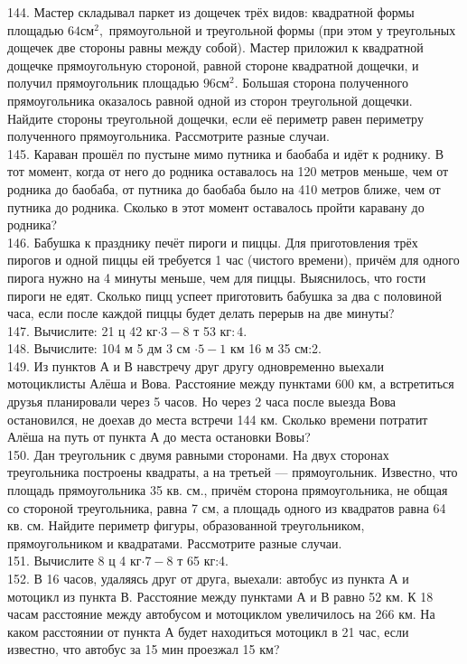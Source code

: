144. Мастер складывал паркет из дощечек трёх видов: квадратной формы площадью $64\text{см}^2,$ прямоугольной и треугольной формы (при этом у треугольных дощечек две стороны равны между собой). Мастер приложил к квадратной дощечке прямоугольную стороной, равной стороне квадратной дощечки, и получил прямоугольник площадью $96\text{см}^2.$ Большая сторона полученного прямоугольника оказалось равной одной из сторон треугольной дощечки. Найдите стороны треугольной дощечки, если её периметр равен периметру полученного прямоугольника. Рассмотрите разные случаи.\\
145. Караван прошёл по пустыне мимо путника и баобаба и идёт к роднику. В тот момент, когда от него до родника оставалось на 120 метров меньше, чем от родника до баобаба, от путника до баобаба было на 410 метров ближе, чем от путника до родника. Сколько в этот момент оставалось пройти каравану до родника?\\
146. Бабушка к празднику печёт пироги и пиццы. Для приготовления трёх пирогов и одной пиццы ей требуется 1 час (чистого времени), причём для одного пирога нужно на 4 минуты меньше, чем для пиццы. Выяснилось, что гости пироги не едят. Сколько пицц успеет приготовить бабушка за два с половиной часа, если после каждой пиццы будет делать перерыв на две минуты?\\
147. Вычислите: 21 ц 42 кг$\cdot3-8$ т 53 кг$:4.$\\
148. Вычислите: 104 м 5 дм 3 см $\cdot 5-1$ км 16 м 35 см:2.\\
149. Из пунктов А и В навстречу друг другу одновременно выехали мотоциклисты Алёша и Вова. Расстояние между пунктами 600 км, а встретиться друзья планировали через 5 часов. Но через 2 часа после выезда Вова остановился, не доехав до места встречи 144 км. Сколько времени потратит Алёша на путь от пункта А до места остановки Вовы?\\
150. Дан треугольник с двумя равными сторонами. На двух сторонах треугольника построены квадраты, а на третьей --- прямоугольник. Известно, что площадь прямоугольника 35 кв. см., причём сторона прямоугольника, не общая со стороной треугольника, равна 7 см, а площадь одного из квадратов равна 64 кв. см. Найдите периметр фигуры, образованной треугольником, прямоугольником и квадратами. Рассмотрите разные случаи.\\
151. Вычислите 8 ц 4 кг$\cdot7-8$ т 65 кг:4.\\
152. В 16 часов, удаляясь друг от друга, выехали: автобус из пункта А и мотоцикл из пункта В. Расстояние между пунктами А и В равно 52 км. К 18 часам расстояние между автобусом и мотоциклом увеличилось на 266 км. На каком расстоянии от пункта А будет находиться мотоцикл в 21 час, если известно, что автобус за 15 мин проезжал 15 км?\\
